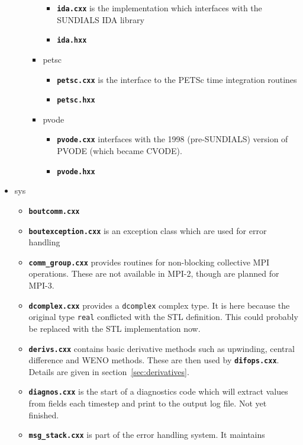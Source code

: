 \documentclass[12pt]{article}
\newcommand{\code}[1]{\texttt{#1}}
\newcommand{\file}[1]{\texttt{\bf #1}}
\begin{document}
\begin{itemize}
\begin{itemize}
\begin{itemize}
      \begin{itemize}
      \item \file{ida.cxx} is the implementation which interfaces with the
        SUNDIALS IDA library
      \item \file{ida.hxx}
      \end{itemize}
    \item petsc
      \begin{itemize}
      \item \file{petsc.cxx} is the interface to the PETSc time integration
        routines
      \item \file{petsc.hxx}
      \end{itemize}
    \item pvode
      \begin{itemize}
      \item \file{pvode.cxx} interfaces with the 1998 (pre-SUNDIALS) version
        of PVODE (which became CVODE).
      \item \file{pvode.hxx}
      \end{itemize}
    \end{itemize}
  \end{itemize}
\item sys
  \begin{itemize}
  \item \file{boutcomm.cxx}
  \item \file{boutexception.cxx} is an exception class which are used
    for error handling
  \item \file{comm\_group.cxx} provides routines for non-blocking collective 
    MPI operations. These are not available in MPI-2, though are planned for
    MPI-3.
  \item \file{dcomplex.cxx} provides a \code{dcomplex} complex type. It is here
    because the original type \code{real} conflicted with the STL definition.
    This could probably be replaced with the STL implementation now.
  \item \file{derivs.cxx} contains basic derivative methods such as
    upwinding, central difference and WENO methods. These are then
    used by \file{difops.cxx}. Details are given in
    section~\ref{sec:derivatives}.
  \item \file{diagnos.cxx} is the start of a diagnostics code which will extract
    values from fields each timestep and print to the output log file. Not
    yet finished.
  \item \file{msg\_stack.cxx} is part of the error handling system. It maintains

\end{itemize}
\end{itemize}
\end{document}
